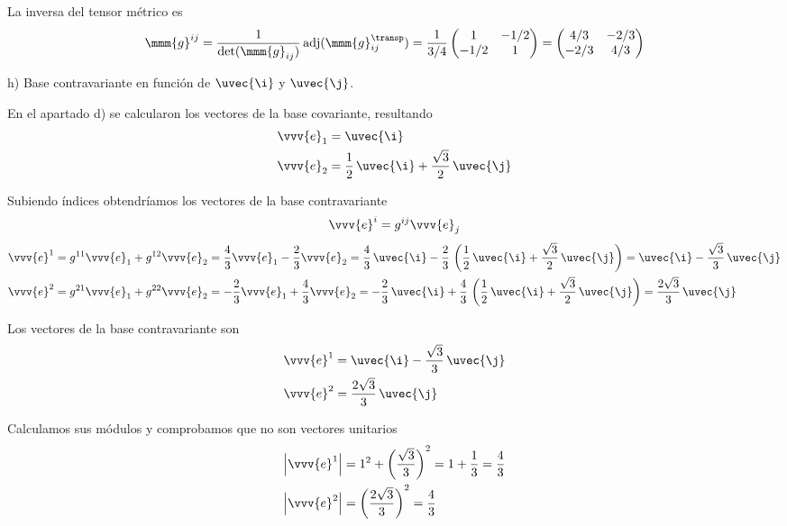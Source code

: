 La inversa del tensor métrico es
\[
  \mmm{g}^{ij}
  = \dfrac{1}{\det(\mmm{g}_{ij})}\, \text{adj}(\mmm{g}_{ij}^\transp)
  = \dfrac{1}{3/4}
  \begin{pmatrix}
    1 & -1/2\\
    -1/2 & 1
  \end{pmatrix}
  = \begin{pmatrix}
    4/3 & -2/3\\
    -2/3 & 4/3
  \end{pmatrix}
\]

\noindent
h) Base contravariante en función de $\uvec{\i}$ y $\uvec{\j}$.

En el apartado d) se calcularon los vectores de la base covariante, resultando
\begin{align*}
  \vvv{e}_1 &= \uvec{\i}\\
  \vvv{e}_2 &= \dfrac{1}{2}\,\uvec{\i} + \dfrac{\sqrt{3}}{2}\,\uvec{\j}
\end{align*}

Subiendo índices obtendríamos los vectores de la base contravariante
\[
  \vvv{e}^i = g^{ij}\vvv{e}_j
\]
\begin{align*}
  \vvv{e}^1
  &=
    g^{11}\vvv{e}_1 + g^{12}\vvv{e}_2
    = \dfrac{4}{3}\vvv{e}_1 - \dfrac{2}{3}\vvv{e}_2
    = \dfrac{4}{3}\,\uvec{\i}
    - \dfrac{2}{3}\,\left(\dfrac{1}{2}\,\uvec{\i}+\dfrac{\sqrt{3}}{2}\,\uvec{\j}\right)
    = \uvec{\i} - \dfrac{\sqrt{3}}{3}\,\uvec{\j}\\
  \vvv{e}^2
  &=
    g^{21}\vvv{e}_1 + g^{22}\vvv{e}_2
    = -\dfrac{2}{3}\vvv{e}_1 + \dfrac{4}{3}\vvv{e}_2
    = -\dfrac{2}{3}\,\uvec{\i}
    + \dfrac{4}{3}\,\left(\dfrac{1}{2}\,\uvec{\i}+\dfrac{\sqrt{3}}{2}\,\uvec{\j}\right)
    = \dfrac{2\sqrt{3}}{3}\,\uvec{\j}  
\end{align*}

Los vectores de la base contravariante son
\begin{align*}
  \vvv{e}^1 &= \uvec{\i} - \dfrac{\sqrt{3}}{3}\,\uvec{\j}\\
  \vvv{e}^2 &= \dfrac{2\sqrt{3}}{3}\,\uvec{\j}
\end{align*}

Calculamos sus módulos y comprobamos que no son vectores unitarios
\begin{align*}
  \left|\vvv{e}^1\right|
  &=
    1^2 + \left(\dfrac{\sqrt{3}}{3}\right)^2
    = 1 + \dfrac{1}{3}
    = \dfrac{4}{3}\\
  \left|\vvv{e}^2\right|
  &=
    \left(\dfrac{2\sqrt{3}}{3}\right)^2
    = \dfrac{4}{3}
\end{align*}

